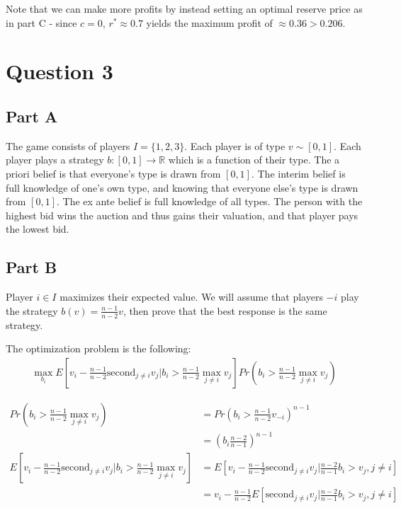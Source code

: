 \documentclass[11pt]{article} %
\begin{document}
Note that we can make more profits by instead setting an optimal reserve price as in part C - since $c=0$, $r^{*} \approx 0.7$ yields the maximum profit of $\approx 0.36>0.206$.

\section{Question 3}
\subsection{Part A}
The game consists of players $I = \{ 1,2,3\}$. Each player is of type $v \sim  [0,1]$. Each player plays a strategy $b:[0,1]\rightarrow \mathbb{R}$ which is a function of their type. The a priori belief is that everyone's type is drawn from $[0,1]$. The interim belief is full knowledge of one's own type, and knowing that everyone else's type is drawn from $[0,1]$. The ex ante belief is full knowledge of all types. The person with the highest bid wins the auction and thus gains their valuation, and that player pays the lowest bid.
\subsection{Part B}
Player $i\in I$ maximizes their expected value. We will assume that  players $-i$ play the strategy $b(v) = \frac{n-1}{n-2}v $, then prove that the best response is the same strategy.

The optimization problem is the following:
\begin{align*}
\max_{b_i}E[v_i - \frac{n-1}{n-2}\text{second}_{j \neq i}v_j|b_i>\frac{n-1}{n-2}\max_{j\neq i} v_j]Pr(b_i>\frac{n-1}{n-2}\max_{j\neq i} v_j) 
\end{align*}

\begin{align*}
Pr(b_i>\frac{n-1}{n-2}\max_{j\neq i} v_j) &= Pr\left(b_i>\frac{n-1}{n-2}v_{-i}\right)^{n-1}\\
&= \left(b_i\frac{n-2}{n-1}\right)^{n-1}\\
E[v_i - \frac{n-1}{n-2}\text{second}_{j \neq i}v_j|b_i>\frac{n-1}{n-2}\max_{j\neq i} v_j]  &= E[v_i - \frac{n-1}{n-2}\text{second}_{j \neq i}v_j|\frac{n-2}{n-1}b_i>v_{j}, j\neq i ] \\
&= v_i - \frac{n-1}{n-2}E[\text{second}_{j \neq i}v_j|\frac{n-2}{n-1}b_i>v_{j}, j\neq i ]
\end{align*}
\end{document}
